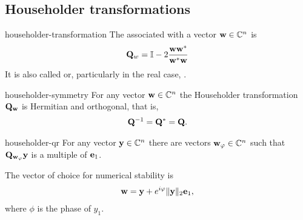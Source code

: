 \subsection{Householder transformations}

\begin{Definition}{householder-transformation}
  The 
  associated with a vector $\mathbf w\in\mathbb C^n$ is
  \begin{gather}
    \mathbf Q_w = \mathbb I - 2\frac{\mathbf w\mathbf w^*}{\mathbf w^*\mathbf w}
  \end{gather}
  It is also called  or, particularly in
  the real case, .
\end{Definition}

\begin{Lemma}{householder-symmetry}
  For any vector $\mathbf w\in\mathbb C^n$ the Householder transformation
  $\mathbf Q_{\mathbf w}$ is Hermitian and orthogonal, that is,
  \begin{gather}
    \mathbf Q^{-1} = \mathbf Q^* = \mathbf Q.
  \end{gather}
\end{Lemma}

\begin{Lemma}{householder-qr}
  For any vector $\mathbf y\in\mathbb C^n$ there are vectors $\mathbf w_\varphi\in\mathbb C^n$ such
  that $\mathbf Q_{\mathbf w_\varphi} \mathbf y$ is a multiple of $\mathbf e_1$.

  The vector of choice for numerical stability is
  \begin{gather}
    \mathbf w = \mathbf y + e^{i\varphi} \lVert\mathbf y\rVert_2\mathbf e_1,
  \end{gather}
  where $\phi$ is the phase of $y_1$.
\end{Lemma}

